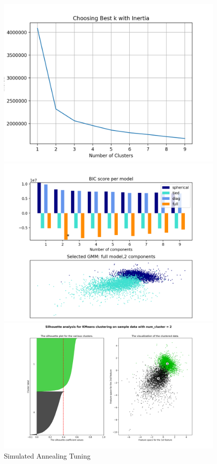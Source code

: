 \documentclass[a4paper,12pt]{article}
\begin{document}
\begin{figure}[!htb]
   \begin{minipage}{0.33\textwidth}
     \centering
     \includegraphics[width=.95\linewidth]{kmeans_rp_dataset2_inertia}
   \end{minipage}\hfill
    \begin{minipage}{0.33\textwidth}
     \centering
     \includegraphics[width=.95\linewidth]{rp_dataset2_em}
     \end{minipage}\hfill
     \begin{minipage}{0.33\textwidth}
     \centering
     \includegraphics[width=.95\linewidth]{rp_dataset2_kmeans_visual_sil}
   \end{minipage}\hfill
 \caption { Simulated Annealing Tuning}
\end{figure}
\end{document}
